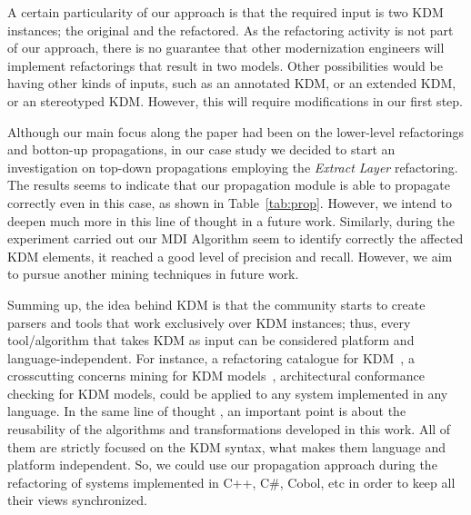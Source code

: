   A certain particularity of our approach is that the required input is two KDM instances; the original and the refactored. As the refactoring activity is not part of our approach, there is no guarantee that other modernization engineers will implement refactorings that result in two models. Other possibilities would be having other kinds of inputs, such as an annotated KDM, or an extended KDM, or an stereotyped KDM. However, this will require modifications in our first step. 
 
Although our main focus along the paper had been on the lower-level refactorings and botton-up propagations, in our case study we decided to start an investigation on top-down propagations employing the \textit{Extract Layer} refactoring. The results seems to indicate that our propagation module is able to propagate correctly even in this case, as shown in Table~\ref{tab:prop}. However, we intend to deepen much more in this line of thought in a future work. Similarly, during the experiment carried out our MDI Algorithm seem to identify correctly the affected KDM elements, it reached a good level of precision and recall. However, we aim to pursue another mining techniques in future work.




Summing up, the idea behind KDM is that the community starts to create parsers and tools that work exclusively over KDM instances; thus, every tool/algorithm that takes KDM as input can be considered platform and language-independent. For instance, a refactoring catalogue for KDM~\cite{IRIDurelliCatalogo}, a crosscutting concerns mining for KDM models~\cite{dani_san}, architectural conformance checking for KDM models, could be applied to any system implemented in any language. In the same line of thought , an important point is about the reusability of the algorithms and transformations developed in this work. All of them are strictly focused on the KDM syntax, what makes them language and platform independent. So, we could use our propagation approach during the refactoring of systems implemented in C++, C\#, Cobol, etc in order to keep all their views synchronized.